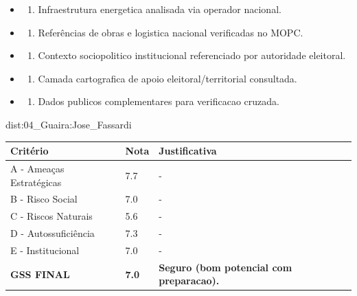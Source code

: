 {\begin{itemize}
\item
  \begin{enumerate}
  \def\labelenumi{\arabic{enumi})}
  \setcounter{enumi}{7}
  \tightlist
  \item
    Infraestrutura energetica analisada via operador nacional.
  \end{enumerate}
\item
  \begin{enumerate}
  \def\labelenumi{\arabic{enumi})}
  \setcounter{enumi}{8}
  \tightlist
  \item
    Referências de obras e logistica nacional verificadas no MOPC.
  \end{enumerate}
\item
  \begin{enumerate}
  \def\labelenumi{\arabic{enumi})}
  \setcounter{enumi}{9}
  \tightlist
  \item
    Contexto sociopolitico institucional referenciado por autoridade
    eleitoral.
  \end{enumerate}
\item
  \begin{enumerate}
  \def\labelenumi{\arabic{enumi})}
  \setcounter{enumi}{10}
  \tightlist
  \item
    Camada cartografica de apoio eleitoral/\allowbreak territorial consultada.
  \end{enumerate}
\item
  \begin{enumerate}
  \def\labelenumi{\arabic{enumi})}
  \setcounter{enumi}{11}
  \tightlist
  \item
    Dados publicos complementares para verificacao cruzada.
  \end{enumerate}
\end{itemize}}{dist:04_Guaira:Jose_Fassardi}
\begin{table}[ht!]
\small \begin{tabular}{p{3.0cm}p{0.8cm}p{6.0cm}} \toprule
\textbf{Critério} & \textbf{Nota} & \textbf{Justificativa} \\ \midrule
A - Ameaças Estratégicas & 7.7 & - \\
B - Risco Social & 7.0 & - \\
C - Riscos Naturais & 5.6 & - \\
D - Autossuficiência & 7.3 & - \\
E - Institucional & 7.0 & - \\
\midrule \textbf{GSS FINAL} & \textbf{7.0} & \textbf{Seguro (bom potencial com preparacao).} \\ \bottomrule \end{tabular}
\end{table}
